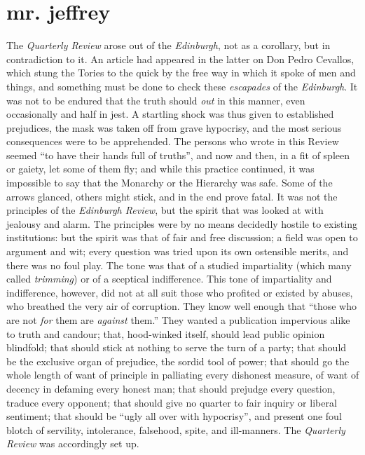 \chapter[Mr. Jeffrey]{mr. jeffrey}

The \emph{Quarterly Review} arose out of the \emph{Edinburgh}, not
as a corollary, but in contradiction to it. An article had
appeared in the latter on Don Pedro Cevallos, which stung the
Tories to the quick by the free way in which it spoke of men and
things, and something must be done to check these \emph{escapades}
of the \emph{Edinburgh}. It was not to be endured that the truth
should \emph{out} in this manner, even occasionally and half in
jest. A startling shock was thus given to established prejudices,
the mask was taken off from grave hypocrisy, and the most serious
consequences were to be apprehended. The persons who wrote in this
Review seemed ``to have their hands full of truths'', and now and
then, in a fit of spleen or gaiety, let some of them fly; and
while this practice continued, it was impossible to say that the
Monarchy or the Hierarchy was safe. Some of the arrows glanced,
others might stick, and in the end prove fatal. It was not the
principles of the \emph{Edinburgh Review}, but the spirit that was
looked at with jealousy and alarm. The principles were by no means
decidedly hostile to existing institutions: but the spirit was
that of fair and free discussion; a field was open to argument and
wit; every question was tried upon its own ostensible merits, and
there was no foul play. The tone was that of a studied
impartiality (which many called \emph{trimming}) or of a sceptical
indifference. This tone of impartiality and indifference, however,
did not at all suit those who profited or existed by abuses, who
breathed the very air of corruption. They know well enough that
``those who are not \emph{for} them are \emph{against} them.''
They wanted a publication impervious alike to truth and candour;
that, hood-winked itself, should lead public opinion blindfold;
that should stick at nothing to serve the turn of a party; that
should be the exclusive organ of prejudice, the sordid tool of
power; that should go the whole length of want of principle in
palliating every dishonest measure, of want of decency in defaming
every honest man; that should prejudge every question, traduce
every opponent; that should give no quarter to fair inquiry or
liberal sentiment; that should be ``ugly all over with
hypocrisy'', and present one foul blotch of servility,
intolerance, falsehood, spite, and ill-manners. The
\emph{Quarterly Review} was accordingly set up.
